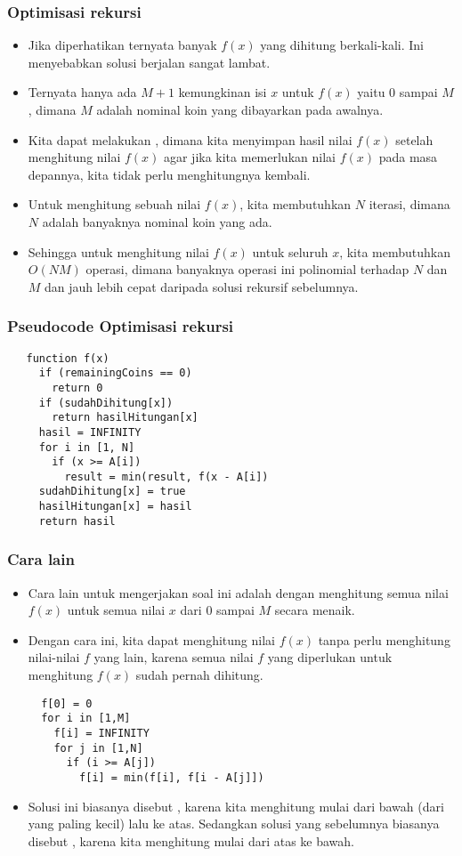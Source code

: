 \begin{frame}
\frametitle{Optimisasi rekursi}
\begin{itemize}
  \item Jika diperhatikan ternyata banyak $f(x)$ yang dihitung berkali-kali. Ini menyebabkan solusi berjalan sangat lambat.
  \item Ternyata hanya ada $M + 1$ kemungkinan isi $x$ untuk $f(x)$ yaitu $0$ sampai $M$, dimana $M$ adalah nominal koin yang dibayarkan pada awalnya.
  \item Kita dapat melakukan , dimana kita menyimpan hasil nilai $f(x)$ setelah menghitung nilai $f(x)$ agar jika kita memerlukan nilai $f(x)$ pada masa depannya, kita tidak perlu menghitungnya kembali.
  \item Untuk menghitung sebuah nilai $f(x)$, kita membutuhkan $N$ iterasi, dimana $N$ adalah banyaknya nominal koin yang ada.
  \item Sehingga untuk menghitung nilai $f(x)$ untuk seluruh $x$, kita membutuhkan $O(NM)$ operasi, dimana banyaknya operasi ini polinomial terhadap $N$ dan $M$ dan jauh lebih cepat daripada solusi rekursif sebelumnya.
\end{itemize}
\end{frame}

\begin{frame} [fragile]
\frametitle{Pseudocode Optimisasi rekursi}
\begin{lstlisting}
   function f(x)
     if (remainingCoins == 0)
       return 0
     if (sudahDihitung[x])
       return hasilHitungan[x]
     hasil = INFINITY
     for i in [1, N]
       if (x >= A[i])
         result = min(result, f(x - A[i])
     sudahDihitung[x] = true
     hasilHitungan[x] = hasil
     return hasil
\end{lstlisting}
\end{frame}

\begin{frame} [fragile]
\frametitle{Cara lain}
\begin{itemize}
  \item Cara lain untuk mengerjakan soal ini adalah dengan menghitung semua nilai $f(x)$ untuk semua nilai $x$ dari $0$ sampai $M$ secara menaik.
  \item Dengan cara ini, kita dapat menghitung nilai $f(x)$ tanpa perlu menghitung nilai-nilai $f$ yang lain, karena semua nilai $f$ yang diperlukan untuk menghitung $f(x)$ sudah pernah dihitung.
\begin{lstlisting}
  f[0] = 0
  for i in [1,M]
    f[i] = INFINITY
    for j in [1,N]
      if (i >= A[j])
        f[i] = min(f[i], f[i - A[j]])
\end{lstlisting}
  \item Solusi ini biasanya disebut , karena kita menghitung mulai dari bawah (dari yang paling kecil) lalu ke atas. Sedangkan solusi yang sebelumnya biasanya disebut , karena kita menghitung mulai dari atas ke bawah.
\end{itemize}
\end{frame}

